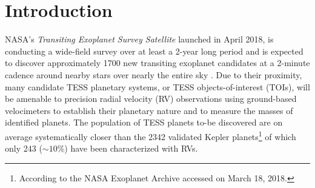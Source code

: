 
\section{Introduction}
NASA's \emph{Transiting Exoplanet Survey Satellite} \citep[TESS; ][]{ricker15} launched in April 2018,
is conducting a wide-field survey over at least a 2-year long period and is expected to discover
approximately 1700 new transiting exoplanet candidates at a 2-minute cadence around nearby stars over
nearly the
entire sky \citep[][hereafter ]{sullivan15}. Due to their proximity,
many candidate TESS planetary systems, or TESS objects-of-interest (TOIs),
will be amenable to precision radial velocity (RV) observations using ground-based velocimeters to
establish their planetary nature and to measure the masses of identified planets.
The population of TESS planets to-be discovered are on average systematically closer than the 2342
validated Kepler planets\footnote{According to the NASA Exoplanet Archive accessed on March 18, 2018.}
of which only 243 ($\sim 10$\%) have been characterized with RVs. \\

